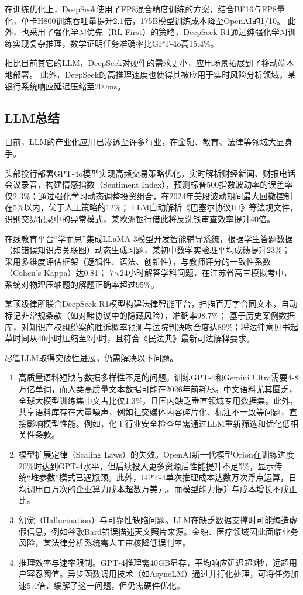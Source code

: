在训练优化上，DeepSeek使用了FP8混合精度训练的方案，结合BF16与FP8量化，单卡H800训练吞吐量提升2.1倍，175B模型训练成本降至OpenAI的1/10。
此外，也采用了​强化学习优先（RL-First）​的策略，DeepSeek-R1通过纯强化学习训练实现复杂推理，数学证明任务准确率比GPT-4o高15.4\%。

相比目前其它的LLM，DeepSeek对硬件的需求更小，应用场景拓展到了移动端本地部署。
此外，DeepSeek的高推理速度也使得其被应用于实时风险分析领域，某银行系统响应延迟压缩至200ms。
\subsection{LLM总结}
目前，LLM的产业化应用已渗透至许多行业，在金融、教育、法律等领域大显身手。

头部投行部署GPT-4o模型实现高频交易策略优化，实时解析财经新闻、财报电话会议录音，构建情感指数（Sentiment Index），预测标普500指数波动率的误差率仅2.3\%；
​通过强化学习动态调整投资组合，在2024年美股波动期间最大回撤控制在5\%以内，优于人工策略的12\%；
LLM自动解析《巴塞尔协议III》等法规文件，识别交易记录中的异常模式，某欧洲银行借此将反洗钱审查效率提升40倍。

在线教育平台“学而思”集成LLaMA-3模型开发智能辅导系统，根据学生答题数据（如错误知识点关联图）动态生成习题，某初中数学实验班平均成绩提升23\%；
采用多维度评估框架（逻辑性、语法、创新性），与教师评分的一致性系数（Cohen's Kappa）达0.81；
7×24小时解答学科问题，在江苏省高三模拟考中，系统对物理压轴题的解题正确率超过95\%。

某顶级律所联合DeepSeek-R1模型构建法律智能平台，扫描百万字合同文本，自动标记非常规条款（如对赌协议中的隐藏风险），准确率98.7\%；
基于历史案例数据库，对知识产权纠纷案的胜诉概率预测与法院判决吻合度达89\%；将法律意见书起草时间从40小时压缩至2小时，且符合《民法典》最新司法解释要求。

尽管LLM取得突破性进展，仍需解决以下问题。
\begin{enumerate}[itemsep=0pt,parsep=0pt]
\item ​高质量语料短缺与数据多样性不足的问题。训练GPT-4和Gemini Ultra需要4-8万亿单词，而人类高质量文本数据可能在2026年前耗尽。中文语料尤其匮乏，全球大模型训练集中文占比仅1.3\%，且国内缺乏垂直领域专用数据集。此外，共享语料库存在大量噪声，例如社交媒体内容碎片化、标注不一致等问题，直接影响模型性能。例如，化工行业安全检查单需通过LLM重新筛选和优化低相关性条款。
\item 模型扩展定律（Scaling Laws）的失效。OpenAI新一代模型Orion在训练进度20\%时达到GPT-4水平，但后续投入更多资源后性能提升不足5\%，显示传统“堆参数”模式已遇瓶颈。此外，GPT-4单次推理成本达数万次浮点运算，日均调用百万次的企业算力成本超数万美元，而模型能力提升与成本增长不成正比。
\item 幻觉（Hallucination）与可靠性缺陷问题。LLM在缺乏数据支撑时可能编造虚假信息，例如谷歌Bard错误描述天文照片来源。金融、医疗领域因此面临业务风险，某法律分析系统需人工审核降低误判率。
\item 推理效率与速率限制。GPT-4推理需40GB显存，平均响应延迟超3秒，远超用户容忍阈值。异步函数调用技术（如AsyncLM）通过并行化处理，可将任务加速5.4倍，缓解了这一问题，但仍需硬件优化。
\end{enumerate}
